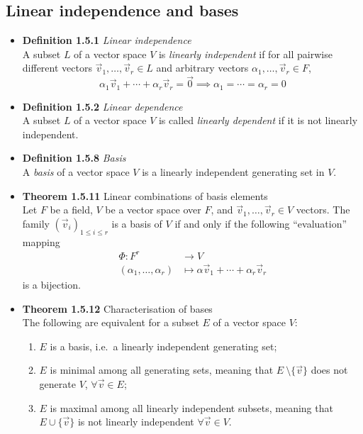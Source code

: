 \documentclass[11pt,a4paper]{article}
\begin{document}
\subsection{Linear independence and bases}

\begin{itemize}

    \item \textbf{Definition 1.5.1} \emph{Linear independence} \\
        A subset $L$ of a vector space $V$ is \emph{linearly independent}
        if for all pairwise different vectors
        $\vec{v}_1, \ldots, \vec{v}_r \in L$ and arbitrary vectors
        $\alpha_1, \ldots, \vec{v}_r \in F$,
        \[
            \alpha_1 \vec{v}_1 + \cdots + \alpha_r \vec{v}_r = \vec{0} \implies
            \alpha_1 = \cdots = \alpha_r = 0
        \]

    \item \textbf{Definition 1.5.2} \emph{Linear dependence} \\
        A subset $L$ of a vector space $V$ is called \emph{linearly dependent} if it is not
        linearly independent.

    \item \textbf{Definition 1.5.8} \emph{Basis} \\
        A \emph{basis} of a vector space $V$ is a linearly independent generating set in
        $V$.

    \item \textbf{Theorem 1.5.11} Linear combinations of basis elements \\
        Let $F$ be a field, $V$ be a vector space over $F$, and
        $\vec{v}_1, \ldots, \vec{v}_r \in V$ vectors.
        The family ${(\vec{v}_i)}_{1 \leq i \leq r}$ is a basis of $V$ if and only if the
        following ``evaluation'' mapping
        \begin{align*}{}
            \Phi : F^r                    & \to V \\
            (\alpha_1, \ldots, \alpha_r)  & \mapsto \alpha\vec{v}_1 +
            \cdots + \alpha_r\vec{v}_r
        \end{align*}
        is a bijection.

    \item \textbf{Theorem 1.5.12} Characterisation of bases \\
        The following are equivalent for a subset $E$ of a vector space $V$:
        \begin{enumerate}
            \item $E$ is a basis, i.e.\ a linearly independent generating set;
            \item $E$ is minimal among all generating sets,
                meaning that $E \ \setminus \{\vec{v}\}$ does not generate $V$,
                $\forall \vec{v} \in E$;
            \item $E$ is maximal among all linearly independent subsets,
                meaning that $E \cup \{\vec{v}\}$ is not linearly independent
                $\forall \vec{v} \in V$.
        \end{enumerate}


\end{itemize}
\end{document}

